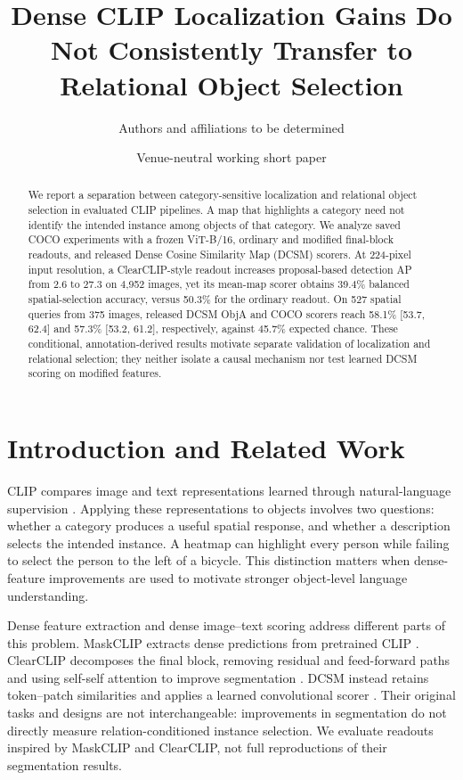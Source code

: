 \documentclass[10pt,twocolumn,letterpaper]{article}
\title{Dense CLIP Localization Gains Do Not Consistently Transfer to Relational Object Selection}
\author{Authors and affiliations to be determined}
\date{Venue-neutral working short paper}
\begin{document}
\raggedbottom
\maketitle
\begin{abstract}
We report a separation between category-sensitive localization and
relational object selection in evaluated CLIP pipelines. A map that
highlights a category need not identify the intended instance among
objects of that category. We analyze saved COCO experiments with a
frozen ViT-B/16, ordinary and modified final-block readouts, and
released Dense Cosine Similarity Map (DCSM) scorers. At 224-pixel input
resolution, a ClearCLIP-style readout increases proposal-based detection
AP from 2.6 to 27.3 on 4,952 images, yet its mean-map scorer obtains
39.4\% balanced spatial-selection accuracy, versus 50.3\% for the
ordinary readout. On 527 spatial queries from 375 images, released DCSM
ObjA and COCO scorers reach 58.1\% {[}53.7, 62.4{]} and 57.3\% {[}53.2,
61.2{]}, respectively, against 45.7\% expected chance. These
conditional, annotation-derived results motivate separate validation of
localization and relational selection; they neither isolate a causal
mechanism nor test learned DCSM scoring on modified features.
\end{abstract}

\section{Introduction and Related
Work}\label{introduction-and-related-work}

CLIP compares image and text representations learned through
natural-language supervision \citep{radford2021clip}. Applying these
representations to objects involves two questions: whether a category
produces a useful spatial response, and whether a description selects
the intended instance. A heatmap can highlight every person while
failing to select the person to the left of a bicycle. This distinction
matters when dense-feature improvements are used to motivate stronger
object-level language understanding.

Dense feature extraction and dense image--text scoring address different
parts of this problem. MaskCLIP extracts dense predictions from
pretrained CLIP \citep{zhou2021maskclip}. ClearCLIP decomposes the final
block, removing residual and feed-forward paths and using self-self
attention to improve segmentation \citep{lan2024clearclip}. DCSM instead
retains token--patch similarities and applies a learned convolutional
scorer \citep{kang2025dcsm}. Their original tasks and designs are not
interchangeable: improvements in segmentation do not directly measure
relation-conditioned instance selection. We evaluate readouts inspired
by MaskCLIP and ClearCLIP, not full reproductions of their segmentation
results.
\end{document}
